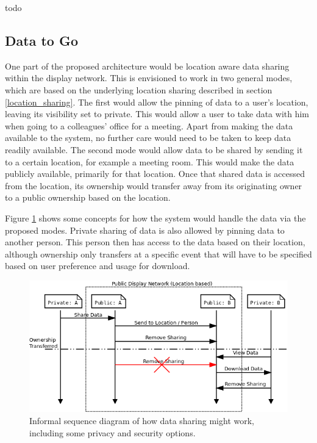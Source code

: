 todo

\subsection{Data to Go}
\label{data2go}

One part of the proposed architecture would be location aware data sharing within the display network.
This is envisioned to work in two general modes, which are based on the underlying location sharing described in section \ref{location_sharing}.
The first would allow the pinning of data to a user's location, leaving its visibility set to private.
This would allow a user to take data with him when going to a colleagues' office for a meeting.
Apart from making the data available to the system, no further care would need to be taken to keep data readily available.
The second mode would allow data to be shared by sending it to a certain location, for example a meeting room.
This would make the data publicly available, primarily for that location.
Once that shared data is accessed from the location, its ownership would transfer away from its originating owner to a public ownership based on the location.

Figure \ref{data_share_sequence} shows some concepts for how the system would handle the data via the proposed modes.
Private sharing of data is also allowed by pinning data to another person.
This person then has access to the data based on their location, although ownership only transfers at a specific event that will have to be specified based on user preference and usage for download.

\begin{figure}
	\centering
	\includegraphics[width=\linewidth]{img/data_sharing.png}
	\caption[Data Sharing Sequence]{Informal sequence diagram of how data sharing might work, including some privacy and security options.}
	\label{data_share_sequence}
\end{figure}

